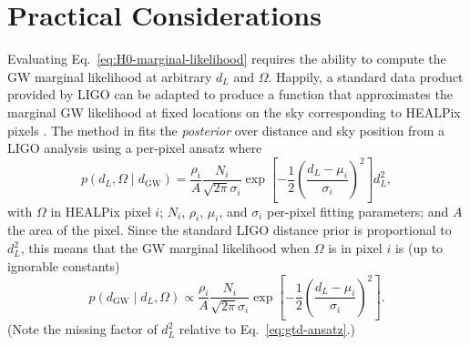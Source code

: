 \documentclass[modern]{aastex62}
\newcommand{\dGW}{d_{\mathrm{GW}}}
\begin{document}
\section{Practical Considerations}

Evaluating Eq.\ \eqref{eq:H0-marginal-likelihood} requires the ability to
compute the \ac{GW} marginal likelihood at arbitrary $d_L$ and $\Omega$.
Happily, a standard data product provided by LIGO \citep{Singer2016} can be
adapted to produce a function that approximates the marginal \ac{GW} likelihood
at fixed locations on the sky corresponding to HEALPix pixels
\citep{Gorski2005}.  The method in \citet{Singer2016} fits the \emph{posterior}
over distance and sky position from a LIGO analysis using a per-pixel ansatz
where
%
\begin{equation}
    \label{eq:gtd-ansatz}
    p\left( d_L, \Omega \mid \dGW \right) = \frac{\rho_i}{A} \frac{N_i}{\sqrt{2\pi} \sigma_i} \exp\left[ -\frac{1}{2} \left(\frac{d_L-\mu_i}{\sigma_i}\right)^2 \right] d_L^2,
\end{equation}
%
with $\Omega$ in HEALPix pixel $i$; $N_i$, $\rho_i$, $\mu_i$, and $\sigma_i$
per-pixel fitting parameters; and $A$ the area of the pixel.  Since the standard
LIGO distance prior is proportional to $d_L^2$, this means that the \ac{GW}
marginal likelihood when $\Omega$ is in pixel $i$ is (up to ignorable constants)
%
\begin{equation}
    p\left( \dGW \mid d_L, \Omega \right) \propto \frac{\rho_i}{A} \frac{N_i}{\sqrt{2\pi} \sigma_i} \exp\left[ -\frac{1}{2} \left(\frac{d_L-\mu_i}{\sigma_i}\right)^2 \right].
\end{equation}
%
(Note the missing factor of $d_L^2$ relative to Eq.\ \eqref{eq:gtd-ansatz}.)
\end{document}
